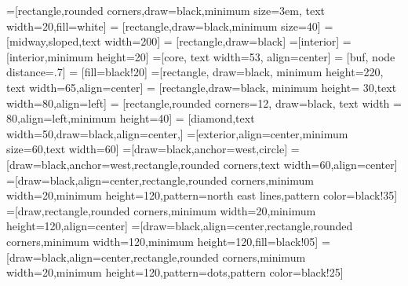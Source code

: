 \usepackage{listingsutf8}
\lstset{inputencoding=utf8/latin1}
\lstset{tabsize=4}
\usepackage{caption}
\usepackage{subcaption}
\usepackage{enumerate}
\usepackage{lineno}
\usepackage{array}
\usepackage{booktabs}
\usepackage[titletoc]{appendix}
\usepackage[binary-units]{siunitx}
\usepackage{titling}
\usepackage{soul}

\usepackage{hyperref}

\usepackage{tikz}
\usetikzlibrary{arrows,backgrounds,fit,positioning,petri,babel,shapes,circuits.logic.mux,circuits.logic.US,shapes.gates.logic,trees,patterns}

=[rectangle,rounded corners,draw=black,minimum size=3em, text width=20,fill=white]
 = [rectangle,draw=black,minimum size=40]
 = [midway,sloped,text width=200]
 = [rectangle,draw=black]
=[interior]
 = [interior,minimum height=20]
=[core, text width=53, align=center]
 = [buf, node distance=.7]
 = [fill=black!20]
=[rectangle, draw=black, minimum height=220, text width=65,align=center]
 = [rectangle,draw=black, minimum height= 30,text width=80,align=left]
 = [rectangle,rounded corners=12, draw=black, text width = 80,align=left,minimum height=40]
 = [diamond,text width=50,draw=black,align=center,]
=[exterior,align=center,minimum size=60,text width=60]
=[draw=black,anchor=west,circle]
=[draw=black,anchor=west,rectangle,rounded corners,text width=60,align=center]
=[draw=black,align=center,rectangle,rounded corners,minimum width=20,minimum height=120,pattern=north east lines,pattern color=black!35]
=[draw,rectangle,rounded corners,minimum width=20,minimum height=120,align=center]
=[draw=black,align=center,rectangle,rounded corners,minimum width=120,minimum height=120,fill=black!05]
=[draw=black,align=center,rectangle,rounded corners,minimum width=20,minimum height=120,pattern=dots,pattern color=black!25]

\newcommand{\epg}[3]{
	Buffer {#1}\\
	[38.5pt]EP{#2}\\
	[38.5pt]{#3} Bytes}

\newcommand{\ep}[3]{
	Buffer {#1}\\
	[8pt]EP{#2}\\
	[8pt]{#3} Bytes}

